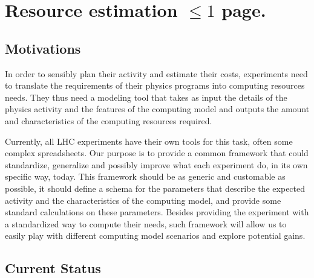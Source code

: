 \section{Resource estimation $\leq 1$ page.}

\subsection{Motivations}

In order to sensibly plan their activity and estimate their costs,
experiments need to translate the requirements of their physics
programs into computing resources needs. They thus need a modeling
tool that takes as input the details of the physics activity
and the features of the computing model 
and outputs the amount and characteristics of the computing resources
required.

Currently, all LHC experiments have their own tools for this task,
often some complex spreadsheets. Our purpose is to provide a common
framework that could standardize, generalize and possibly improve what
each experiment do, in its own specific way, today. This framework
should be as generic and customable as possible, it should define a
schema for the parameters that describe the expected activity and the
characteristics of the computing model, and provide some standard
calculations on these parameters.  Besides providing the experiment
with a standardized way to compute their needs, such framework will
allow us to easily play with different computing model scenarios and
explore potential gains.

\subsection{Current Status}

